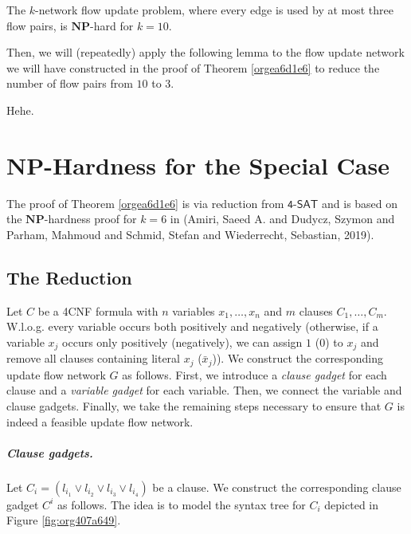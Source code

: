 \documentclass[fontsize=11pt,paper=a4]{book}
\begin{document}
\begin{thm}
The \(k\)-network flow update problem, where every edge is used by at most three flow pairs, is \(\textbf{NP}\)-hard for \(k=10\).
\label{orgea6d1e6}
\end{thm}

Then, we will (repeatedly) apply the following lemma to the flow update network we will have constructed in the proof of Theorem \ref{orgea6d1e6} to reduce the number of flow pairs from \(10\) to \(3\).

\begin{lem}
Hehe.
\label{orgc1908b1}
\end{lem}

\chapter{\(\textbf{NP}\)-Hardness for the Special Case}
\label{sec:org8eb8156}

The proof of Theorem \ref{orgea6d1e6} is via reduction from \(\textsf{4-SAT}\) and is based on the \(\textbf{NP}\)-hardness proof for \(k=6\) in (Amiri, Saeed A. and Dudycz, Szymon and Parham, Mahmoud and Schmid, Stefan and Wiederrecht, Sebastian, 2019).

\section{The Reduction}
\label{sec:org0ef05a0}

Let \(C\) be a 4CNF formula with \(n\) variables \(x_1,\dots,x_n\) and \(m\) clauses \(C_1,\dots,C_m\).
W.l.o.g. every variable occurs both positively and negatively (otherwise, if a variable \(x_j\) occurs only positively (negatively), we can assign \(1\) (\(0\)) to \(x_j\) and remove all clauses containing literal \(x_j\) (\(\bar{x}_j\))).
We construct the corresponding update flow network \(G\) as follows.
First, we introduce a \emph{clause gadget} for each clause and a \emph{variable gadget} for each variable.
Then, we connect the variable and clause gadgets.
Finally, we take the remaining steps necessary to ensure that \(G\) is indeed a feasible update flow network.

\paragraph{Clause gadgets.}
Let \(C_i=(l_{i_1}\vee l_{i_2}\vee l_{i_3}\vee l_{i_4})\) be a clause.
We construct the corresponding clause gadget \(C^i\) as follows.
The idea is to model the syntax tree for \(C_i\) depicted in Figure \ref{fig:org407a649}.
\end{document}
